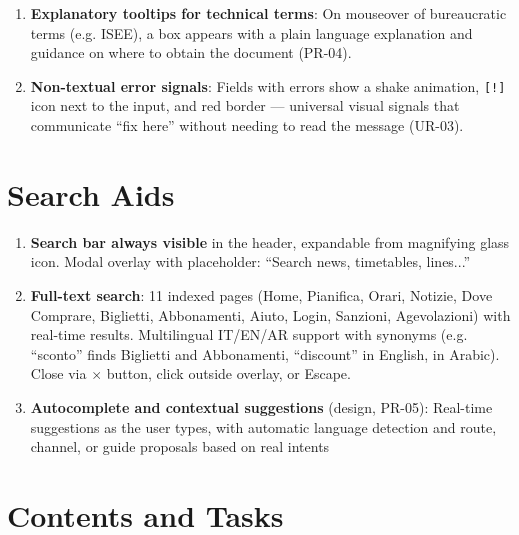 ﻿\documentclass[11pt,a4paper]{article}
\begin{document}
\begin{tcolorbox}[rffield]
\begin{enumerate}[nosep,leftmargin=*]
  \item \textbf{Explanatory tooltips for technical terms}: On mouseover of bureaucratic terms (e.g. ISEE), a box appears with a plain language explanation and guidance on where to obtain the document (PR-04).
  \item \textbf{Non-textual error signals}: Fields with errors show a shake animation, \texttt{[!]} icon next to the input, and red border --- universal visual signals that communicate ``fix here'' without needing to read the message (UR-03).
\end{enumerate}
\end{tcolorbox}

\section{Search Aids}

\begin{tcolorbox}[rffield]
\small
\begin{enumerate}[nosep,leftmargin=*]
  \item \textbf{Search bar always visible} in the header, expandable from magnifying glass icon. Modal overlay with placeholder: ``Search news, timetables, lines...''
  \item \textbf{Full-text search}: 11 indexed pages (Home, Pianifica, Orari, Notizie, Dove Comprare, Biglietti, Abbonamenti, Aiuto, Login, Sanzioni, Agevolazioni) with real-time results. Multilingual IT/EN/AR support with synonyms (e.g. ``sconto'' finds Biglietti and Abbonamenti, ``discount'' in English, in Arabic). Close via $\times$ button, click outside overlay, or Escape.

  \item \textbf{Autocomplete and contextual suggestions} (design, PR-05): Real-time suggestions as the user types, with automatic language detection and route, channel, or guide proposals based on real intents

\end{enumerate}
\end{tcolorbox}

\section{Contents and Tasks}
\end{document}
